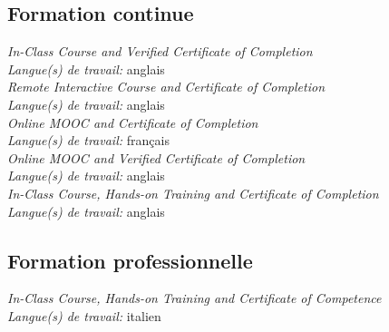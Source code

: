 \documentclass[
  a4paper, 
]{fortysecondscv}
\begin{document}
\subsection{Formation continue}
\begin{cvtable}
		{{\small\emph{\small In-Class Course and Verified Certificate of Completion}\\\textit{\small Langue(s) de travail:} anglais}\\[-0.8em]}
		{{\small\emph{\small Remote Interactive Course and Certificate of Completion}\\\textit{\small Langue(s) de travail:} anglais}\\[-0.8em]}
		{{\small\emph{\small Online MOOC and Certificate of Completion}\\\textit{\small Langue(s) de travail:} fran\c cais}\\[-0.8em]}
		{{\small\emph{\small Online MOOC and Verified Certificate of Completion}\\\textit{\small Langue(s) de travail:} anglais}\\[-0.8em]}
		{{\small\emph{\small In-Class Course, Hands-on Training and Certificate of Completion}\\\textit{\small Langue(s) de travail:} anglais}}
\end{cvtable}
\subsection{Formation professionnelle}
\begin{cvtable}
		{{\small\emph{\small In-Class Course, Hands-on Training and Certificate of Competence}\\\textit{\small Langue(s) de travail:} italien}}
\end{cvtable}
\end{document}
